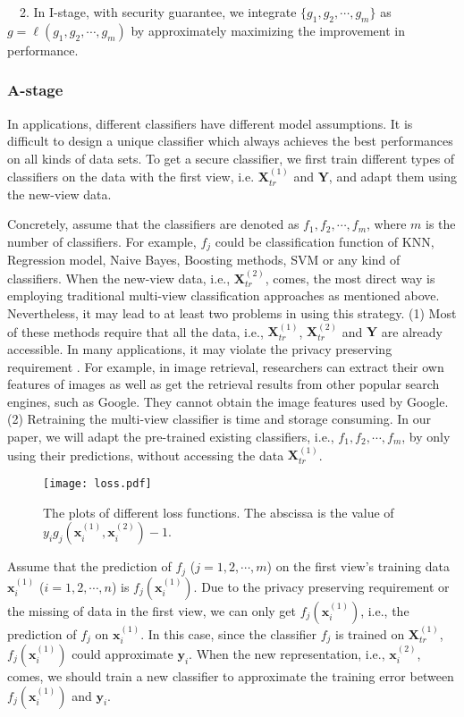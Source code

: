 \documentclass[10pt,journal,compsoc]{IEEEtran}
\begin{document}
~~2. In I-stage, with security guarantee, we integrate $ \{ g_1, g_2, \cdots, g_m\}$ as $g = \ell(g_1, g_2, \cdots, g_m)$ by approximately maximizing the improvement in performance.

\subsubsection{A-stage}

In applications, different classifiers have different model assumptions. It is difficult to design a unique classifier which always achieves the best performances on all kinds of data sets. To get a secure classifier, we first train different types of classifiers on the data with the first view, i.e. $\mathbf{X}_{tr}^{(1)}$ and $\mathbf{Y}$, and adapt them using the new-view data.

Concretely, assume that the classifiers are denoted as $f_1, f_2, \cdots, f_m$, where $m$ is the number of classifiers. For example, $f_j$ could be classification function of KNN, Regression model, Naive Bayes, Boosting methods, SVM or any kind of classifiers. When the new-view data, i.e., $\mathbf{X}_{tr}^{(2)}$, comes, the most direct way is employing traditional multi-view classification approaches as mentioned above. Nevertheless, it may lead to at least two problems in using this strategy. (1) Most of these methods require that all the data, i.e., $\mathbf{X}_{tr}^{(1)}$, $\mathbf{X}_{tr}^{(2)}$ and $\mathbf{Y}$ are already accessible. In many applications, it may violate the privacy preserving requirement \cite{cikm/YeZMJZ15}. For example, in image retrieval, researchers can extract their own features of images as well as get the retrieval results from other popular search engines, such as Google. They cannot obtain the image features used by Google. (2) Retraining the multi-view classifier is time and storage consuming. In our paper, we will adapt the pre-trained existing classifiers, i.e., $f_1,f_2,\cdots, f_m$, by only using their predictions, without accessing the data $\mathbf{X}_{tr}^{(1)}$.

\begin{figure}[!t]
\centering
\texttt{[image: loss.pdf]}
\caption{The plots of different loss functions. The abscissa is the value of $y_i g_j(\mathbf{x}_i^{(1)},\mathbf{x}_i^{(2)})-1$.}
\label{fig_loss}
\vskip -0.2in
\end{figure}

Assume that the prediction of $f_j$ ($j=1, 2, \cdots, m$) on the first view's training data $\mathbf{x}_i^{(1)}$ ($i=1, 2, \cdots, n$) is $f_j(\mathbf{x}_i^{(1)})$. Due to the privacy preserving requirement or the missing of data in the first view, we can only get $f_j(\mathbf{x}_i^{(1)})$, i.e., the prediction of $f_j$ on $\mathbf{x}_i^{(1)}$. In this case, since the classifier $f_j$ is trained on $\mathbf{X}_{tr}^{(1)}$, $f_j(\mathbf{x}_i^{(1)})$ could approximate $\mathbf{y}_i$. When the new representation, i.e., $\mathbf{x}_i^{(2)}$, comes, we should train a new classifier to approximate the training error between $f_j(\mathbf{x}_i^{(1)})$ and $\mathbf{y}_i$.
\end{document}
